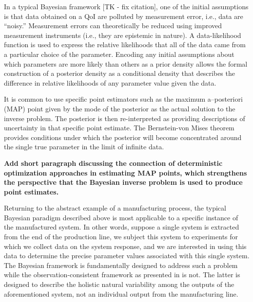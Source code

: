 In a typical Bayesian framework [TK - fix citation]\cite{0266-5611-7-5-003,
  Kennedy_O_JRSSSB_2001,Tarantola_book, MNR07, CDS10,starktenorio,
  AlexanderianPetraStadlerEtAl14, Bui-ThanhGhattas14, Ernst2014,
  0266-5611-30-11-110301, ROM:CMW_2016,Stuart10,
  cockayneoatessullivangirolami}, one of the initial assumptions is that data obtained on a QoI are polluted by measurement error, i.e., data are ``noisy.''
  Measurement errors can theoretically be reduced using improved measurement instruments (i.e., they are epistemic in nature).
  A data-likelihood function is used to express the relative likelihoods that all of the data came from a particular choice of the parameter.
  Encoding any initial assumptions about which parameters are more likely than others as a prior density allows the formal construction of a posterior density as a conditional density that describes the difference in relative likelihoods of any parameter value given the data.

It is common to use specific point estimators such as the maximum a--posteriori (MAP) point given by the mode of the posterior as the actual solution to the inverse problem.
The posterior is then re-interpreted as providing descriptions of uncertainty in that specific point estimate.
The Bernstein-von Mises theorem provides conditions under which the posterior will become concentrated around the single true parameter in the limit of infinite data.

{\bf Add short paragraph discussing the connection of deterministic optimization approaches in estimating MAP points, which strengthens the perspective that the Bayesian inverse problem is used to produce point estimates.}

Returning to the abstract example of a manufacturing process, the typical Bayesian paradigm described above is most applicable to a specific instance of the manufactured system.
In other words, suppose a single system is extracted from the end of the production line, we subject this system to experiments for which we collect data on the system response, and we are interested in using this data to determine the precise parameter values associated with this single system.
The Bayesian framework is fundamentally designed to address such a problem while the observation-consistent framework as presented in \cite{BJW18a, BJW18b, BWY20} is not.
The latter is designed to describe the holistic natural variability among the outputs of the aforementioned system, not an individual output from the manufacturing line.


